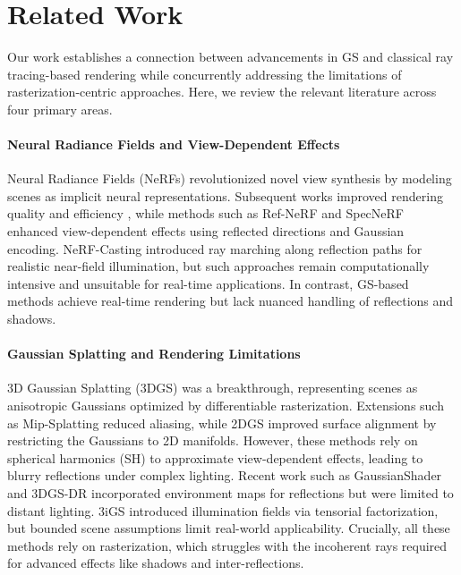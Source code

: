 \section{Related Work}
Our work establishes a connection between advancements in GS and classical ray tracing-based rendering while concurrently addressing the limitations of rasterization-centric approaches. Here, we review the relevant literature across four primary areas.

\paragraph{Neural Radiance Fields and View-Dependent Effects}
Neural Radiance Fields (NeRFs) \cite{mildenhall2021nerf} revolutionized novel view synthesis by modeling scenes as implicit neural representations. Subsequent works improved rendering quality \cite{barron2021mip, barron2022mip, barron2023zip} and efficiency \cite{chen2022tensorf, fridovich2022plenoxels, muller2022instant}, while methods such as Ref-NeRF \cite{verbin2022ref} and SpecNeRF \cite{ma2024specnerf} enhanced view-dependent effects using reflected directions and Gaussian encoding. NeRF-Casting \cite{verbin2024nerf} introduced ray marching along reflection paths for realistic near-field illumination, but such approaches remain computationally intensive and unsuitable for real-time applications. In contrast, GS-based methods achieve real-time rendering but lack nuanced handling of reflections and shadows.

\paragraph{Gaussian Splatting and Rendering Limitations}
3D Gaussian Splatting (3DGS) \cite{kerbl20233d} was a breakthrough, representing scenes as anisot\-ropic Gaussians optimized by differentiable rasterization. Extensions such as Mip-Splatting \cite{yu2024mip} reduced aliasing, while 2DGS \cite{huang20242d} improved surface alignment by restricting the Gaussians to 2D manifolds. However, these methods rely on spherical harmonics (SH) to approximate view-dependent effects, leading to blurry reflections under complex lighting. Recent work such as GaussianShader \cite{jiang2024gaussianshader} and 3DGS-DR \cite{ye20243d} incorporated environment maps for reflections but were limited to distant lighting. 3iGS \cite{tang20253igs} introduced illumination fields via tensorial factorization, but bounded scene assumptions limit real-world applicability. Crucially, all these methods rely on rasterization, which struggles with the incoherent rays required for advanced effects like shadows and inter-reflections.

